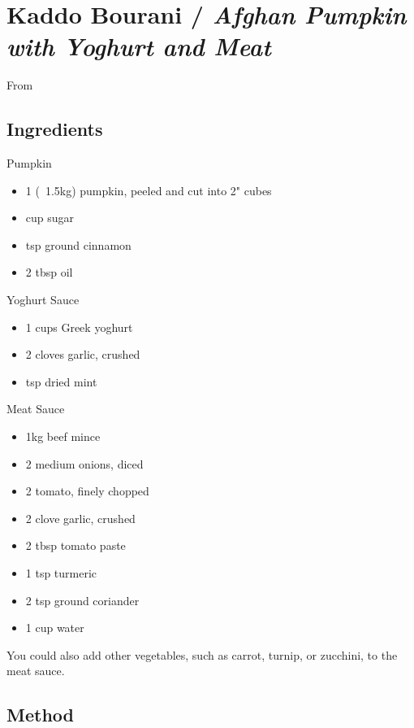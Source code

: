 \section{Kaddo Bourani / \emph{Afghan Pumpkin with Yoghurt and Meat}}


From 

\subsection{Ingredients}

Pumpkin

\begin{itemize}
	\item 1 (~1.5kg) pumpkin, peeled and cut into 2" cubes
	\item {} cup sugar
	\item {} tsp ground cinnamon
	\item 2 tbsp oil
\end{itemize}

Yoghurt Sauce

\begin{itemize}
	\item 1 cups Greek yoghurt
	\item 2 cloves garlic, crushed
	\item {} tsp dried mint
\end{itemize}

Meat Sauce

\begin{itemize}
    \item 1kg beef mince
    \item 2 medium onions, diced
    \item 2 tomato, finely chopped
    \item 2 clove garlic, crushed
    \item 2 tbsp tomato paste
    \item 1 tsp turmeric
    \item 2 tsp ground coriander
    \item 1 cup water
\end{itemize}

You could also add other vegetables, such as carrot, turnip, or zucchini, to the meat sauce.

\subsection{Method}

